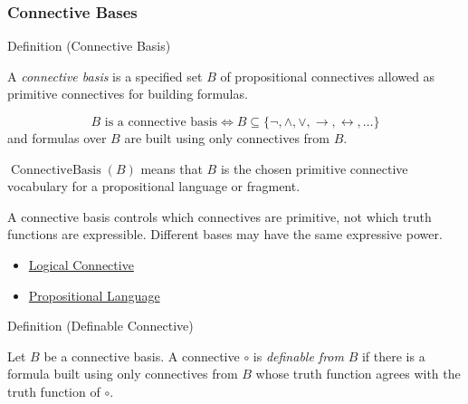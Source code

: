 \subsubsection*{Connective Bases}

\begin{definitionbox}{Definition (Connective Basis)}
\begin{definition}
\label{def:connective-basis-propositional-logic}
A \emph{connective basis} is a specified set \(B\) of propositional connectives
allowed as primitive connectives for building formulas.
\end{definition}
\end{definitionbox}

\begin{remark*}
\[
B\text{ is a connective basis}
\Longleftrightarrow
B\subseteq\{\neg,\land,\lor,\to,\leftrightarrow,\ldots\}
\]
and formulas over \(B\) are built using only connectives from \(B\).
\end{remark*}

\begin{remark*}
\(\operatorname{ConnectiveBasis}(B)\) means that \(B\) is the chosen primitive
connective vocabulary for a propositional language or fragment.
\end{remark*}

\begin{remark*}[Interpretation]
A connective basis controls which connectives are primitive, not which truth
functions are expressible. Different bases may have the same expressive power.
\end{remark*}

\begin{dependencies}
\begin{itemize}
  \item \hyperref[def:logical-connective]{Logical Connective}
  \item \hyperref[def:propositional-language]{Propositional Language}
\end{itemize}
\end{dependencies}

\begin{definitionbox}{Definition (Definable Connective)}
\begin{definition}
\label{def:definable-connective-propositional-logic}
Let \(B\) be a connective basis. A connective \(\circ\) is \emph{definable from}
\(B\) if there is a formula built using only connectives from \(B\) whose truth
function agrees with the truth function of \(\circ\).
\end{definition}
\end{definitionbox}

